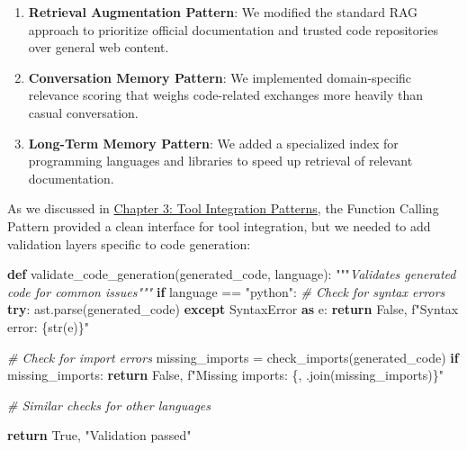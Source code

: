 \documentclass[11pt,oneside]{book}
\newenvironment{Shaded}{\begin{tcolorbox}[
  breakable,
  enhanced,
  colback=codebackground,
  colframe=codeframe,
  arc=0.5mm,
  boxrule=0.5pt,
  left=12pt,
  right=12pt,
  top=8pt,
  bottom=8pt,
  fontupper=\ttfamily\small,
  before upper={\setlength{\baselineskip}{1.4em}},
  after upper={\vspace{2pt}},
  drop shadow={opacity=0.1},
  title={},
  overlay unbroken and first={
    \node[anchor=south east, xshift=-5pt, yshift=5pt, text=secondarycolor!70, font=\tiny\ttfamily] at (frame.north east) {code};
  }
]}{\end{tcolorbox}}
\newcommand{\CommentTok}[1]{\textcolor{pythoncomment}{\textit{#1}}}
\newcommand{\ControlFlowTok}[1]{\textcolor{pythongreen}{\textbf{#1}}}
\newcommand{\DocumentationTok}[1]{\textcolor{pythondocstring}{\textit{#1}}}
\newcommand{\ImportTok}[1]{\textcolor{pythongreen}{\textbf{#1}}}
\newcommand{\KeywordTok}[1]{\textcolor{pythongreen}{\textbf{#1}}}
\newcommand{\NormalTok}[1]{#1}
\newcommand{\FunctionTok}[1]{\textcolor{pythonblue}{#1}}
\newcommand{\StringTok}[1]{\textcolor{pythonpurple}{#1}}
\newcommand{\VariableTok}[1]{\textcolor{pythonblue}{#1}}
\begin{document}
\begin{enumerate}
\def\labelenumi{\arabic{enumi}.}
\item
  \textbf{Retrieval Augmentation Pattern}: We modified the standard RAG
  approach to prioritize official documentation and trusted code
  repositories over general web content.
\item
  \textbf{Conversation Memory Pattern}: We implemented domain-specific
  relevance scoring that weighs code-related exchanges more heavily than
  casual conversation.
\item
  \textbf{Long-Term Memory Pattern}: We added a specialized index for
  programming languages and libraries to speed up retrieval of relevant
  documentation.
\end{enumerate}

As we discussed in \href{03_tool_integration_patterns.md}{Chapter 3:
Tool Integration Patterns}, the Function Calling Pattern provided a
clean interface for tool integration, but we needed to add validation
layers specific to code generation:

\begin{Shaded}
\begin{Highlighting}[]
\KeywordTok{def} \FunctionTok{validate\_code\_generation}\NormalTok{(generated\_code, language):}
    \StringTok{"""}\DocumentationTok{Validates generated code for common issues"""}
    \ControlFlowTok{if}\NormalTok{ language == }\StringTok{"python"}\NormalTok{:}
        \CommentTok{\# Check for syntax errors}
        \ControlFlowTok{try}\NormalTok{:}
\NormalTok{            ast.}\FunctionTok{parse}\NormalTok{(generated\_code)}
        \ControlFlowTok{except}\NormalTok{ SyntaxError }\ImportTok{as}\NormalTok{ e:}
            \ControlFlowTok{return} \VariableTok{False}\NormalTok{, f}\StringTok{"Syntax error: \{str(e)\}"}

        \CommentTok{\# Check for import errors}
\NormalTok{        missing\_imports = }\FunctionTok{check\_imports}\NormalTok{(generated\_code)}
        \ControlFlowTok{if}\NormalTok{ missing\_imports:}
            \ControlFlowTok{return} \VariableTok{False}\NormalTok{, f}\StringTok{"Missing imports: \{\textquotesingle{}, \textquotesingle{}.join(missing\_imports)\}"}

    \CommentTok{\# Similar checks for other languages}

    \ControlFlowTok{return} \VariableTok{True}\NormalTok{, }\StringTok{"Validation passed"}
\end{Highlighting}
\end{Shaded}
\end{document}
